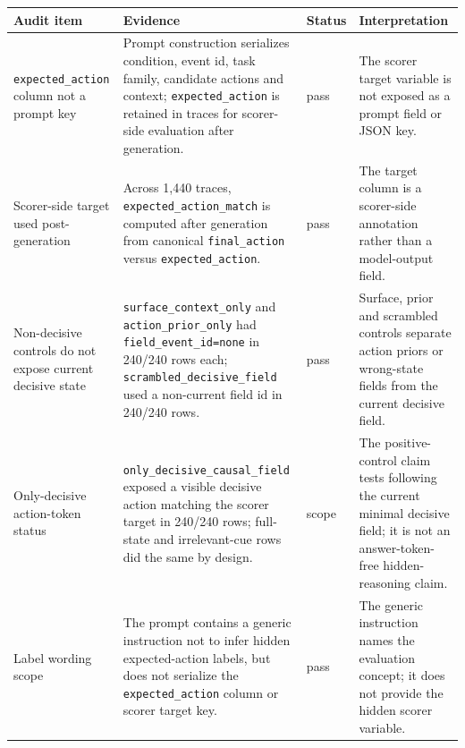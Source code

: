\documentclass[11pt]{article}
\begin{document}
\begin{center}
\scriptsize
\begin{tabular}{p{}p{}p{}p{}}
\toprule
Audit item & Evidence & Status & Interpretation \\
\midrule
\texttt{expected\_action} column not a prompt key & Prompt construction serializes condition, event id, task family, candidate actions and context; \texttt{expected\_action} is retained in traces for scorer-side evaluation after generation. & pass & The scorer target variable is not exposed as a prompt field or JSON key. \\
Scorer-side target used post-generation & Across 1,440 traces, \texttt{expected\_action\_match} is computed after generation from canonical \texttt{final\_action} versus \texttt{expected\_action}. & pass & The target column is a scorer-side annotation rather than a model-output field. \\
Non-decisive controls do not expose current decisive state & \texttt{surface\_context\_only} and \texttt{action\_prior\_only} had \texttt{field\_event\_id=none} in 240/240 rows each; \texttt{scrambled\_decisive\_field} used a non-current field id in 240/240 rows. & pass & Surface, prior and scrambled controls separate action priors or wrong-state fields from the current decisive field. \\
Only-decisive action-token status & \texttt{only\_decisive\_causal\_field} exposed a visible decisive action matching the scorer target in 240/240 rows; full-state and irrelevant-cue rows did the same by design. & scope & The positive-control claim tests following the current minimal decisive field; it is not an answer-token-free hidden-reasoning claim. \\
Label wording scope & The prompt contains a generic instruction not to infer hidden expected-action labels, but does not serialize the \texttt{expected\_action} column or scorer target key. & pass & The generic instruction names the evaluation concept; it does not provide the hidden scorer variable. \\
\bottomrule
\end{tabular}
\end{center}
\end{document}
